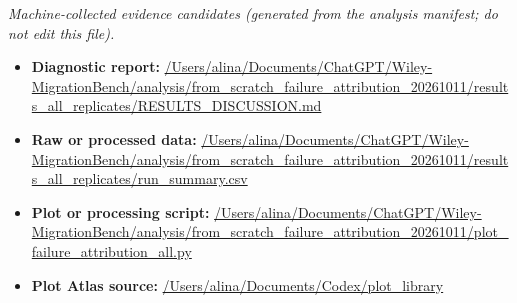 \emph{Machine-collected evidence candidates (generated from the analysis manifest; do not edit this file).}
\begin{itemize}[leftmargin=1.4em,noitemsep]
\item \textbf{Diagnostic report:} \url{/Users/alina/Documents/ChatGPT/Wiley-MigrationBench/analysis/from_scratch_failure_attribution_20261011/results_all_replicates/RESULTS_DISCUSSION.md}
\item \textbf{Raw or processed data:} \url{/Users/alina/Documents/ChatGPT/Wiley-MigrationBench/analysis/from_scratch_failure_attribution_20261011/results_all_replicates/run_summary.csv}
\item \textbf{Plot or processing script:} \url{/Users/alina/Documents/ChatGPT/Wiley-MigrationBench/analysis/from_scratch_failure_attribution_20261011/plot_failure_attribution_all.py}
\item \textbf{Plot Atlas source:} \url{/Users/alina/Documents/Codex/plot_library}
\end{itemize}
